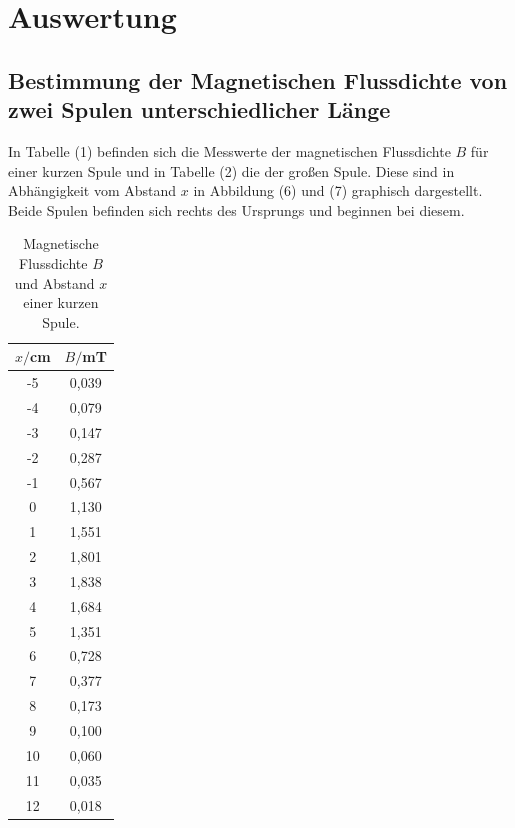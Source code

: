 \section{Auswertung}
\label{sec:Auswertung}

\subsection{Bestimmung der Magnetischen Flussdichte von zwei Spulen unterschiedlicher Länge}
In Tabelle (1) befinden sich die Messwerte der magnetischen Flussdichte $B$ für einer kurzen Spule und in Tabelle (2) die der großen Spule.
Diese sind in Abhängigkeit vom Abstand $x$ in Abbildung (6) und (7) graphisch dargestellt.
Beide Spulen befinden sich rechts des Ursprungs und beginnen bei diesem.

\begin{minipage}{0.5\textwidth}
\begin{table}[H]
  \centering
  \caption{Magnetische Flussdichte $B$ \\ und Abstand $x$ einer kurzen Spule.}
  \begin{tabular}{c c}
    \toprule
     $x/$cm & $B/$mT  \\
    \midrule
    -5 & 0,039 \\
    -4 & 0,079 \\
    -3 & 0,147 \\
    -2 & 0,287 \\
    -1 & 0,567 \\
    0 & 1,130\\
    1 & 1,551 \\
    2 & 1,801 \\
    3 & 1,838 \\
    4 & 1,684 \\
    5 & 1,351 \\
    6 & 0,728 \\
    7 & 0,377 \\
    8 & 0,173 \\
    9 & 0,100 \\
    10 & 0,060 \\
    11 & 0,035 \\
    12 & 0,018 \\
  \bottomrule
  \end{tabular}
\end{table}
\end{minipage}
